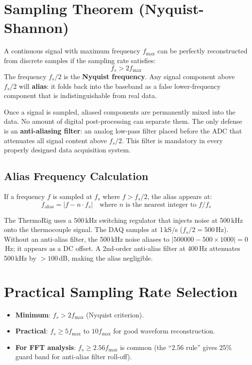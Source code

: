 \documentclass[11pt,letterpaper,twoside,openany]{book}
\begin{document}
\section{Sampling Theorem (Nyquist-Shannon)}
A continuous signal with maximum frequency $f_{\max}$ can be perfectly reconstructed from discrete samples if the sampling rate satisfies:
\begin{equation}
f_s > 2 f_{\max}
\end{equation}
The frequency $f_s/2$ is the \textbf{Nyquist frequency}. Any signal component above $f_s/2$ will \textbf{alias}: it folds back into the baseband as a false lower-frequency component that is indistinguishable from real data.

\begin{warningbox}
Once a signal is sampled, aliased components are permanently mixed into the data. No amount of digital post-processing can separate them. The only defense is an \textbf{anti-aliasing filter}: an analog low-pass filter placed before the ADC that attenuates all signal content above $f_s/2$. This filter is mandatory in every properly designed data acquisition system.
\end{warningbox}

\subsection{Alias Frequency Calculation}
If a frequency $f$ is sampled at $f_s$ where $f > f_s/2$, the alias appears at:
\begin{equation}
f_{\text{alias}} = |f - n \cdot f_s| \quad \text{where } n \text{ is the nearest integer to } f/f_s
\end{equation}


\begin{examplebox}
The ThermoRig uses a 500\,kHz switching regulator that injects noise at 500\,kHz onto the thermocouple signal. The DAQ samples at 1\,kS/s ($f_s/2 = 500$\,Hz). Without an anti-alias filter, the 500\,kHz noise aliases to $|500000 - 500 \times 1000| = 0$\,Hz; it appears as a DC offset. A 2nd-order anti-alias filter at 400\,Hz attenuates 500\,kHz by $> 100$\,dB, making the alias negligible.
\end{examplebox}

\section{Practical Sampling Rate Selection}
\begin{itemize}[leftmargin=1.5em]
\item \textbf{Minimum}: $f_s > 2 f_{\max}$ (Nyquist criterion).
\item \textbf{Practical}: $f_s \geq 5 f_{\max}$ to $10 f_{\max}$ for good waveform reconstruction.
\item \textbf{For FFT analysis}: $f_s \geq 2.56 f_{\max}$ is common (the ``2.56 rule'' gives 25\% guard band for anti-alias filter roll-off).
\end{itemize}
\end{document}

